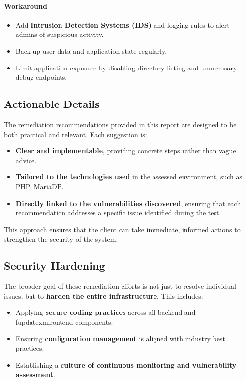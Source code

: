 \documentclass[12pt]{article}
\begin{document}
\paragraph{Workaround}
\begin{itemize}
    \item Add \textbf{Intrusion Detection Systems (IDS)} and logging rules to alert admins of suspicious activity.
    \item Back up user data and application state regularly.
    \item Limit application exposure by disabling directory listing and unnecessary debug endpoints.
\end{itemize}

\subsection{Actionable Details}
The remediation recommendations provided in this report are designed to be both practical and relevant. Each suggestion is:
\begin{itemize}
\item \textbf{Clear and implementable}, providing concrete steps rather than vague advice.
\item \textbf{Tailored to the technologies used} in the assessed environment, such as PHP, MariaDB.
\item \textbf{Directly linked to the vulnerabilities discovered}, ensuring that each recommendation addresses a specific issue identified during the test.
\end{itemize}
This approach ensures that the client can take immediate, informed actions to strengthen the security of the system.

\subsection{Security Hardening}
The broader goal of these remediation efforts is not just to resolve individual issues, but to \textbf{harden the entire infrastructure}. This includes:
\begin{itemize}
    \item Applying \textbf{secure coding practices} across all backend and fupdatexmlrontend components.
    \item Ensuring \textbf{configuration management} is aligned with industry best practices.
    \item Establishing a \textbf{culture of continuous monitoring and vulnerability assessment}.
\end{itemize}
\end{document}
